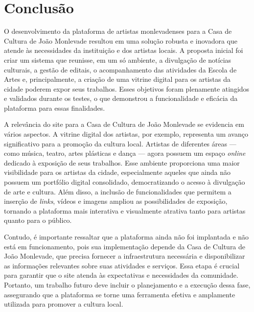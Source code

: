 \chapter[Conclusão]{Conclusão}

O desenvolvimento da plataforma de artistas monlevadenses para a Casa de Cultura de João Monlevade resultou em uma solução robusta e inovadora que atende às necessidades da instituição e dos artistas locais. A proposta inicial foi criar um sistema que reunisse, em um só ambiente, a divulgação de notícias culturais, a gestão de editais, o acompanhamento das atividades da Escola de Artes e, principalmente, a criação de uma vitrine digital para os artistas da cidade poderem expor seus trabalhos. Esses objetivos foram plenamente atingidos e validados durante os testes, o que demonstrou a funcionalidade e eficácia da plataforma para essas finalidades.

A relevância do site para a Casa de Cultura de João Monlevade se evidencia em vários aspectos. A vitrine digital dos artistas, por exemplo, representa um avanço significativo para a promoção da cultura local. Artistas de diferentes áreas — como música, teatro, artes plásticas e dança — agora possuem um espaço \textit{online} dedicado à exposição de seus trabalhos. Esse ambiente proporciona uma maior visibilidade para os artistas da cidade, especialmente aqueles que ainda não possuem um portfólio digital consolidado, democratizando o acesso à divulgação de arte e cultura. Além disso, a inclusão de funcionalidades que permitem a inserção de \textit{links}, vídeos e imagens ampliou as possibilidades de exposição, tornando a plataforma mais interativa e visualmente atrativa tanto para artistas quanto para o público.

Contudo, é importante ressaltar que a plataforma ainda não foi implantada e não está em funcionamento, pois sua implementação depende da Casa de Cultura de João Monlevade, que precisa fornecer a infraestrutura necessária e disponibilizar as informações relevantes sobre suas atividades e serviços. Essa etapa é crucial para garantir que o site atenda às expectativas e necessidades da comunidade. Portanto, um trabalho futuro deve incluir o planejamento e a execução dessa fase, assegurando que a plataforma se torne uma ferramenta efetiva e amplamente utilizada para promover a cultura local.

